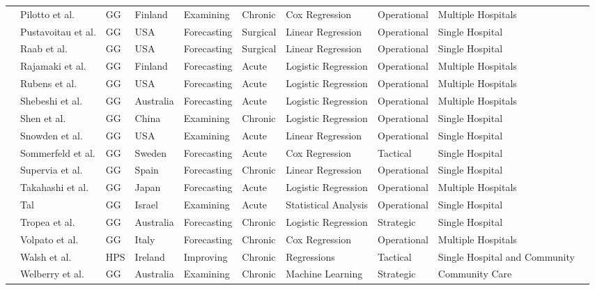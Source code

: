 \documentclass[thesis.tex]{subfiles}
\begin{document}
\begin{landscape}
\begin{table}[]
{\begin{tabular}{@{}llllllllll@{}}
    \cite{Pilotto2016} & Pilotto et al. & GG & Finland & Examining & Chronic & Cox Regression & Operational & Multiple Hospitals \\
   \cite{Pustavoitau2016} & Pustavoitau et al. & GG & USA & Forecasting & Surgical & Linear Regression & Operational & Single Hospital\\
    \cite{Raab2022} & Raab et al. & GG & USA & Forecasting & Surgical & Linear Regression & Operational & Single Hospital\\
    \cite{Rajamaki2020} & Rajamaki et al. & GG & Finland & Forecasting & Acute & Logistic Regression & Operational & Multiple Hospitals \\
    \cite{Rubens2022} & Rubens et al. & GG & USA &Forecasting & Acute & Logistic Regression & Operational & Multiple Hospitals\\
    \cite{Shebeshi2021} & Shebeshi et al. & GG & Australia & Forecasting & Acute & Logistic Regression & Operational & Multiple Hospitals \\
    \cite{Shen2019} & Shen et al. & GG & China & Examining & Chronic & Logistic Regression & Operational & Single Hospital \\
    \cite{Snowden2004} & Snowden et al. & GG & USA &Examining & Acute & Linear Regression & Operational & Single Hospital \\
    \cite{Sommerfeld2011} & Sommerfeld et al. & GG & Sweden & Forecasting & Acute & Cox Regression & Tactical & Single Hospital \\
    \cite{Supervia2008} & Supervia et al. & GG & Spain & Forecasting & Chronic & Linear Regression & Operational & Single Hospital \\
    \cite{Takahashi2011} & Takahashi et al. & GG & Japan & Forecasting & Acute & Logistic Regression & Operational & Multiple Hospitals \\
    \cite{Tal2021} & Tal & GG & Israel & Examining & Acute & Statistical Analysis & Operational & Single Hospital \\
    \cite{Tropea2016} & Tropea et al. & GG & Australia & Forecasting & Chronic & Logistic Regression & Strategic & Single Hospital \\
    \cite{Volpato2014} & Volpato et al. & GG & Italy & Forecasting & Chronic & Cox Regression & Operational & Multiple Hospitals\\
    \cite{Walsh2020} & Walsh et al. & HPS & Ireland & Improving & Chronic & Regressions & Tactical & Single Hospital and Community\\   
  \cite{Welberry}  &Welberry et al.&GG&Australia&Examining&Chronic&Machine Learning&Strategic&Community Care\\

\end{tabular}}
\end{table}
\end{landscape}
\end{document}
